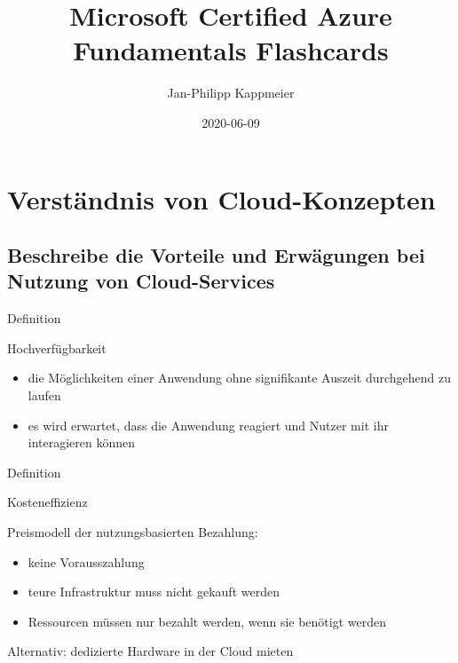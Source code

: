 \documentclass{scrartcl}
\newenvironment{flashcard}[2][]{%
    #1
    \vfill
    \centerline{\Large{#2}}
    \vfill
\newpage
}
{\newpage}
\newcommand{\sectioncard}[1]{
    \vspace*{\stretch{1}}
    \section{#1}
    \vspace*{\stretch{1}}
    \pagebreak
}
\newcommand{\subsectioncard}[1]{
    \vspace*{\stretch{1}}
    \subsection{#1}
    \vspace*{\stretch{1}}
    \pagebreak
}
\begin{document}
    \title{Microsoft Certified Azure Fundamentals Flashcards}
    \date{2020-06-09}
    \author{Jan-Philipp Kappmeier}

    \clearpage\maketitle
    \thispagestyle{empty}
    \pagebreak

    \sectioncard{Verständnis von Cloud-Konzepten}

    \subsectioncard{Beschreibe die Vorteile und Erwägungen bei Nutzung von Cloud-Services}

    \begin{flashcard}[Definition]{Hochverfügbarkeit}
        \begin{itemize}
            \item die Möglichkeiten einer Anwendung ohne signifikante Auszeit durchgehend zu laufen
            \item es wird erwartet, dass die Anwendung reagiert und Nutzer mit ihr interagieren können
        \end{itemize}
    \end{flashcard}

    \begin{flashcard}[Definition]{Kosteneffizienz}
        Preismodell der nutzungsbasierten Bezahlung:
        \begin{itemize}
            \item keine Vorausszahlung
            \item teure Infrastruktur muss nicht gekauft werden
            \item Ressourcen müssen nur bezahlt werden, wenn sie benötigt werden
        \end{itemize}

        \vspace{5mm}
        Alternativ: dedizierte Hardware in der Cloud mieten
    \end{flashcard}
\end{document}
